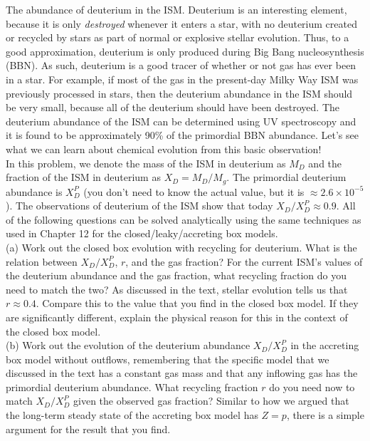 \documentclass[12pt]{article}
\begin{document}
 The abundance of deuterium in the ISM. Deuterium is an 
interesting element, because it is only \emph{destroyed} whenever it 
enters a star, with no deuterium created or recycled by stars as part of normal or 
explosive stellar evolution. Thus, to a good approximation, deuterium is only produced 
during Big Bang nucleosynthesis (BBN). As such, deuterium is a good tracer of whether 
or not gas has ever been in a star. For example, if most of the gas in the present-day 
Milky Way ISM was previously processed in stars, then the deuterium abundance in the 
ISM should be very small, because all of the deuterium should have been destroyed. 
The deuterium abundance of the ISM can be determined using UV spectroscopy and it is 
found to be approximately 90\% of the primordial BBN abundance. Let’s see what we can 
learn about chemical evolution from this basic observation!\\

In this problem, we denote the mass of the ISM in deuterium as \(M_D\) and the fraction 
of the ISM in deuterium as \(X_D = M_D/M_g\). The primordial deuterium abundance is 
\(X_D^P\) (you don't need to know the actual value, but it is 
\(\approx 2.6\times 10^{-5}\)). The observations of deuterium of the ISM show that 
today \(X_D/X_D^P \approx 0.9\). All of the following questions can be solved 
analytically using the same techniques as used in Chapter 12 for the 
closed/leaky/accreting box models.\\

(a) Work out the closed box evolution with recycling for deuterium. What is the 
relation between \(X_D/X_D^P\), \(r\), and the gas fraction? For the current ISM's 
values of the deuterium abundance and the gas fraction, what recycling fraction do you 
need to match the two? As discussed in the text, stellar evolution tells us that 
\(r \approx 0.4\). Compare this to the value that you find in the closed box model. 
If they are significantly different, explain the physical reason for this in the context 
of the closed box model.\\

(b) Work out the evolution of the deuterium abundance \(X_D/X_D^P\) in the accreting box 
model without outflows, remembering that the specific model that we discussed in the 
text has a constant gas mass and that any inflowing gas has the primordial deuterium 
abundance. What recycling fraction \(r\) do you need now to match \(X_D/X_D^P\) given 
the observed gas fraction? Similar to how we argued that the long-term 
steady state of the accreting box model has \(Z=p\), there is a simple argument for the 
result that you find.\\
\end{document}
